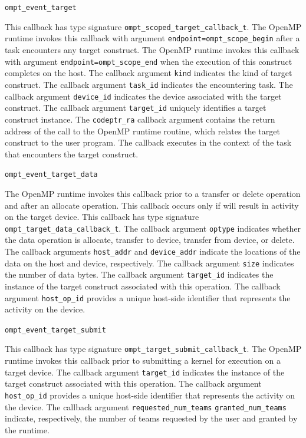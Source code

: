 \documentclass{article}
\begin{document}
\begin{description}

\item \verb|ompt_event_target|

This callback has type signature \verb|ompt_scoped_target_callback_t|.
The OpenMP runtime invokes this callback with argument \verb|endpoint=ompt_scope_begin| after a task encounters any target construct. 
The OpenMP runtime invokes this callback with argument \verb|endpoint=ompt_scope_end| when the execution of this construct completes on the host. 
The callback argument \verb|kind| indicates the kind of target construct.
The callback argument \verb|task_id| indicates the encountering task.
The callback argument \verb|device_id| indicates the device associated with the target  construct.
The callback argument \verb|target_id| uniquely identifies a target construct instance. 
The \verb|codeptr_ra| callback argument contains the return address of the call to the OpenMP runtime routine, which relates the target construct to the user program. 
The callback executes in the context of the task that encounters the target construct.

\item \verb|ompt_event_target_data|

The OpenMP runtime invokes this callback prior to a transfer or delete operation and after an allocate operation. 
This callback occurs only if will result in activity on the target device.
This callback has type signature \verb|ompt_target_data_callback_t|.
The callback argument \verb|optype| indicates  whether the data operation is allocate, transfer to device, transfer from device, or delete.
The callback arguments \verb|host_addr| and \verb|device_addr|  indicate the locations of the data on the host and device, respectively.
The callback argument \verb|size| indicates the number of data bytes.
The callback argument \verb|target_id| indicates the instance of the target construct associated with this operation.
The callback argument \verb|host_op_id| provides a unique host-side identifier that represents the activity on the device.

\item \verb|ompt_event_target_submit|

This callback has type signature \verb|ompt_target_submit_callback_t|.
The OpenMP runtime invokes this callback prior to submitting a kernel for execution on a target device. 
The callback argument \verb|target_id| indicates the instance of the target construct associated with this operation.
The callback argument \verb|host_op_id| provides a unique host-side identifier that represents the activity on the device.
The callback argument \verb|requested_num_teams|  \verb|granted_num_teams| indicate, respectively, the number of teams requested by the user and granted by the runtime.

\end{description}
\end{document}
